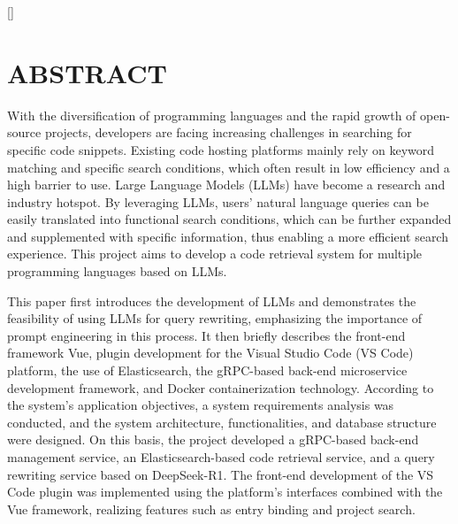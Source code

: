 \documentclass[UTF8,a4paper,12pt]{ctexart}
\numberwithin{equation}{section}
\renewcommand\thesection{\arabic{section}}
\begin{document}
\newpage
{}

\titleformat{\section}[block]{\centering\bfseries\fontspec{Times New Roman}\fontsize{16pt}{20pt}\selectfont}{\thesection}{1em}{}[]

\section*{ABSTRACT}
With the diversification of programming languages and the rapid growth of open-source projects, developers are facing increasing challenges in searching for specific code snippets. Existing code hosting platforms mainly rely on keyword matching and specific search conditions, which often result in low efficiency and a high barrier to use. Large Language Models (LLMs) have become a research and industry hotspot. By leveraging LLMs, users' natural language queries can be easily translated into functional search conditions, which can be further expanded and supplemented with specific information, thus enabling a more efficient search experience. This project aims to develop a code retrieval system for multiple programming languages based on LLMs.\par

This paper first introduces the development of LLMs and demonstrates the feasibility of using LLMs for query rewriting, emphasizing the importance of prompt engineering in this process. It then briefly describes the front-end framework Vue, plugin development for the Visual Studio Code (VS Code) platform, the use of Elasticsearch, the gRPC-based back-end microservice development framework, and Docker containerization technology. According to the system's application objectives, a system requirements analysis was conducted, and the system architecture, functionalities, and database structure were designed. On this basis, the project developed a gRPC-based back-end management service, an Elasticsearch-based code retrieval service, and a query rewriting service based on DeepSeek-R1. The front-end development of the VS Code plugin was implemented using the platform's interfaces combined with the Vue framework, realizing features such as entry binding and project search.\par
\end{document}
